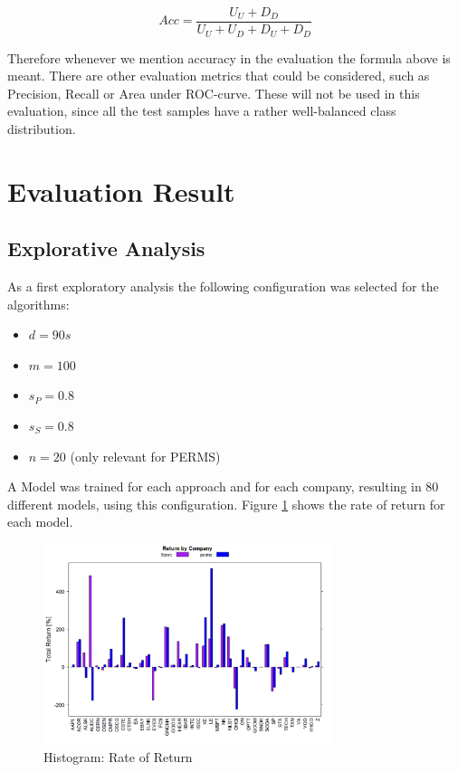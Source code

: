 \[ Acc = \frac{U_U + D_D}{U_U +U_D +D_U+D_D}\]

Therefore whenever we mention accuracy in the evaluation the formula above is meant. There are other evaluation metrics that could be considered, such as Precision, Recall or Area under ROC-curve. These will not be used in this evaluation, since all the test samples have a rather well-balanced class distribution.



\section{Evaluation Result}
\label{sec_evaluationResults}

\subsection{Explorative Analysis}
\label{subsec_explorativeAnalysis}

As a first exploratory analysis the following configuration was selected for the algorithms:

\begin{itemize}
	\item $d = 90s$
	\item $m = 100$ 
	\item $s_P = 0.8$
	\item $s_S = 0.8$
	\item $n = 20$ (only relevant for PERMS)
\end{itemize}

A Model was trained for each approach and for each company, resulting in 80 different models, using this configuration. Figure \ref{fig_firstRunReturnByCompany} shows the rate of return for each model.

\begin{figure}[h]
	\centering
  	\includegraphics[width=0.75\textwidth]{firstRunReturnByCompany}
	\caption{Histogram: Rate of Return}
	\label{fig_firstRunReturnByCompany}
\end{figure}

